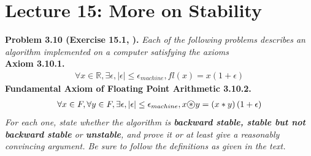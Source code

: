 \documentclass[a4paper,oneside]{book}
\numberwithin{equation}{chapter}
\begin{document}
\section{Lecture 15: More on Stability}
\textbf{Problem 3.10 (Exercise 15.1, \cite{1}).} \textit{Each of the following problems describes an algorithm implemented on a computer satisfying the axioms}\\
\textbf{Axiom 3.10.1.}
\begin{align}
\label{3.11}
\forall x \in \mathbb{R},\exists \epsilon ,\left| \epsilon  \right| \le {\epsilon _{machine}},fl\left( x \right) = x\left( {1 + \epsilon } \right)
\end{align}
\textbf{Fundamental Axiom of Floating Point Arithmetic 3.10.2.}
\begin{align}
\label{3.12}
\forall x \in F,\forall y \in F,\exists \epsilon ,\left| \epsilon  \right| \le {\epsilon _{machine}},x \raisebox{.3pt}{\textcircled{\raisebox{-3pt} {*}}}  y = \left( {x * y} \right)\left( {1 + \epsilon } \right)
\end{align}
\textit{For each one, state whether the algorithm is \textbf{backward stable, stable but not backward stable} or \textbf{unstable}, and prove it or at least give a reasonably convincing argument. Be sure to follow the definitions as given in the text.}
\end{document}

